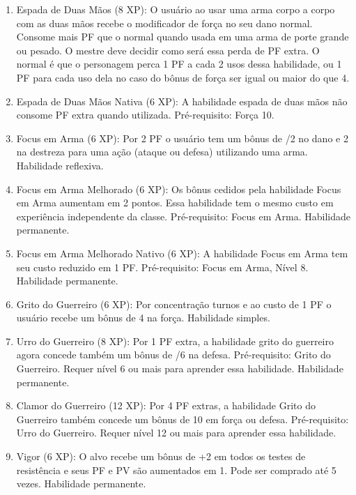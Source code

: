 \begin{enumerate}
	\item Espada de Duas Mãos (8 XP): O usuário ao usar uma arma corpo a corpo com as duas mãos recebe o modificador de força no seu dano normal. Consome mais PF que o normal quando usada em uma arma de porte grande ou pesado. O mestre deve decidir como será essa perda de PF extra. O normal é que o personagem perca 1 PF a cada 2 usos dessa habilidade, ou 1 PF para cada uso dela no caso do bônus de força ser igual ou maior do que 4. 

	\item Espada de Duas Mãos Nativa (6 XP): A habilidade espada de duas mãos não consome PF extra quando utilizada. Pré-requisito: Força 10. 

	\item Focus em Arma (6 XP): Por 2 PF o usuário tem um bônus de /2 no dano e 2 na destreza para uma ação (ataque ou defesa) utilizando uma arma. Habilidade reflexiva.

	\item Focus em Arma Melhorado (6 XP): Os bônus cedidos pela habilidade Focus em Arma aumentam em 2 pontos. Essa habilidade tem o mesmo custo em experiência independente da classe. Pré-requisito: Focus em Arma. Habilidade permanente.

	\item Focus em Arma Melhorado Nativo (6 XP): A habilidade Focus em Arma tem seu custo reduzido em 1 PF. Pré-requisito: Focus em Arma, Nível 8. Habilidade permanente.

	\item Grito do Guerreiro (6 XP): Por concentração turnos e ao custo de 1 PF o usuário recebe um bônus de 4 na força. Habilidade simples. 
	
	\item Urro do Guerreiro (8 XP): Por 1 PF extra, a habilidade grito do guerreiro agora concede também um bônus de /6 na defesa. Pré-requisito: Grito do Guerreiro. Requer nível 6 ou mais para aprender essa habilidade. Habilidade permanente.
		
	\item Clamor do Guerreiro (12 XP): Por 4 PF extras, a habilidade Grito do Guerreiro também concede um bônus de 10 em força ou defesa. Pré-requisito: Urro do Guerreiro. Requer nível 12 ou mais para aprender essa habilidade.
		
	\item Vigor (6 XP): O alvo recebe um bônus de +2 em todos os testes de resistência e seus PF e PV são aumentados em 1. Pode ser comprado até 5 vezes. Habilidade permanente.


\end{enumerate}
